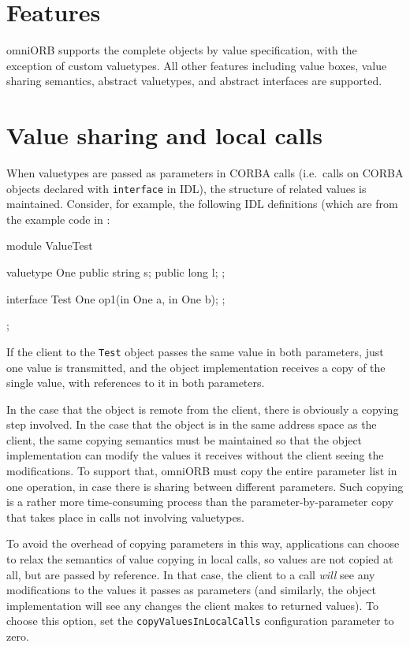 \documentclass[11pt,twoside,a4paper]{book}
\newcommand{\type}[1]{\texttt{#1}}
\newcommand{\code}[1]{\texttt{#1}}
\newcommand{\file}{\begingroup \urlstyle{tt}\Url}
\begin{document}
\section{Features}

omniORB supports the complete objects by value specification, with the
exception of custom valuetypes. All other features including value
boxes, value sharing semantics, abstract valuetypes, and abstract
interfaces are supported.


\section{Value sharing and local calls}

When valuetypes are passed as parameters in CORBA calls (i.e.\ calls
on CORBA objects declared with \code{interface} in IDL), the structure
of related values is maintained. Consider, for example, the following
IDL definitions (which are from the example code in
\file{src/examples/valuetype/simple}:

\begin{idllisting}
module ValueTest {
  valuetype One {
    public string s;
    public long   l;
  };

  interface Test {
    One op1(in One a, in One b);
  };
};
\end{idllisting}

If the client to the \type{Test} object passes the same value in both
parameters, just one value is transmitted, and the object
implementation receives a copy of the single value, with references to
it in both parameters.

In the case that the object is remote from the client, there is
obviously a copying step involved. In the case that the object is in
the same address space as the client, the same copying semantics must
be maintained so that the object implementation can modify the values
it receives without the client seeing the modifications. To support
that, omniORB must copy the entire parameter list in one operation, in
case there is sharing between different parameters. Such copying is a
rather more time-consuming process than the parameter-by-parameter
copy that takes place in calls not involving valuetypes.

To avoid the overhead of copying parameters in this way, applications
can choose to relax the semantics of value copying in local calls, so
values are not copied at all, but are passed by reference. In that
case, the client to a call \emph{will} see any modifications to the
values it passes as parameters (and similarly, the object
implementation will see any changes the client makes to returned
values). To choose this option, set the \code{copyValuesInLocalCalls}
configuration parameter to zero.
\end{document}
